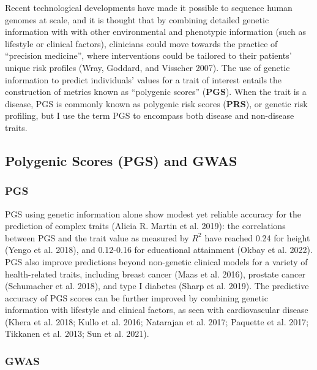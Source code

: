 \documentclass[
]{book}
\begin{document}
Recent technological developments have made it possible to sequence human genomes at scale, and it is thought that by combining detailed genetic information with with other environmental and phenotypic information (such as lifestyle or clinical factors), clinicians could move towards the practice of ``precision medicine'', where interventions could be tailored to their patients' unique risk profiles (Wray, Goddard, and Visscher 2007). The use of genetic information to predict individuals' values for a trait of interest entails the construction of metrics known as ``polygenic scores'' (\textbf{PGS}). When the trait is a disease, PGS is commonly known as polygenic risk scores (\textbf{PRS}), or genetic risk profiling, but I use the term PGS to encompass both disease and non-disease traits.

\hypertarget{polygenic-scores-pgs-and-gwas}{%
\subsection{Polygenic Scores (PGS) and GWAS}\label{polygenic-scores-pgs-and-gwas}}

\hypertarget{pgs}{%
\subsubsection{PGS}\label{pgs}}

PGS using genetic information alone show modest yet reliable accuracy for the prediction of complex traits (Alicia R. Martin et al. 2019): the correlations between PGS and the trait value as measured by \(R^2\) have reached 0.24 for height (Yengo et al. 2018), and 0.12-0.16 for educational attainment (Okbay et al. 2022). PGS also improve predictions beyond non-genetic clinical models for a variety of health-related traits, including breast cancer (Maas et al. 2016), prostate cancer (Schumacher et al. 2018), and type I diabetes (Sharp et al. 2019). The predictive accuracy of PGS scores can be further improved by combining genetic information with lifestyle and clinical factors, as seen with cardiovascular disease (Khera et al. 2018; Kullo et al. 2016; Natarajan et al. 2017; Paquette et al. 2017; Tikkanen et al. 2013; Sun et al. 2021).

\hypertarget{gwas}{%
\subsubsection{GWAS}\label{gwas}}
\end{document}

